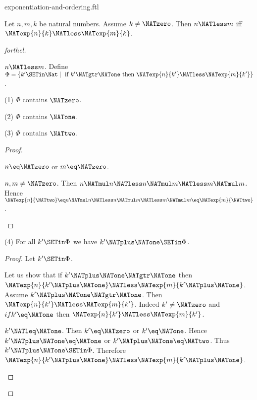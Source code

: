 \documentclass{naproche-library}
\begin{document}
\begin{smodule}[title=Exponentiation and Ordering]{exponentiation-and-ordering.ftl}

\begin{proposition}[forthel,id=ARITHMETIC_09_3373702288769024]
  Let $n, m, k$ be natural numbers.
  Assume $k \neq \NATzero$.
  Then $n \NATless m$ iff $\NATexp{n}{k} \NATless \NATexp{m}{k}$.
\end{proposition}
\begin{proof}[forthel]
  \begin{case}{$n \NATless m$.}
    Define $\Phi = \{ k' \SETin \Nat \mid\text{ if }k' \NATgtr \NATone\text{ then }\NATexp{n}{k'} \NATless \NATexp{m}{k'} \}$.

    (1) $\Phi$ contains $\NATzero$.

    (2) $\Phi$ contains $\NATone$.

    (3) $\Phi$ contains $\NATtwo$.
    \begin{proof}
      \begin{case}{$n \eq \NATzero$ or $m \eq \NATzero$.} \end{case}

      \begin{case}{$n, m \neq \NATzero$.}
        Then $n \NATmul n
          \NATless n \NATmul m
          \NATless m \NATmul m$.
        Hence $\NATexp{n}{\NATtwo}
          \eq n \NATmul n
          \NATless n \NATmul m
          \NATless m \NATmul m
          \eq \NATexp{m}{\NATtwo}$.
      \end{case}
    \end{proof}

    (4) For all $k' \SETin \Phi$ we have $k' \NATplus \NATone \SETin \Phi$.
    \begin{proof}
      Let $k' \SETin \Phi$.

      Let us show that if $k' \NATplus \NATone \NATgtr \NATone$ then $\NATexp{n}{k' \NATplus \NATone} \NATless \NATexp{m}{k' \NATplus \NATone}$.
        Assume $k' \NATplus \NATone \NATgtr \NATone$.
        Then $\NATexp{n}{k'} \NATless \NATexp{m}{k'}$.
        Indeed $k' \neq \NATzero$ and $if k' \eq \NATone$ then $\NATexp{n}{k'} \NATless \NATexp{m}{k'}$.

        \begin{case}{$k' \NATleq \NATone$.}
          Then $k' \eq \NATzero$ or $k' \eq \NATone$.
          Hence $k' \NATplus \NATone \eq \NATone$ or $k' \NATplus \NATone \eq \NATtwo$.
          Thus $k' \NATplus \NATone \SETin \Phi$.
          Therefore $\NATexp{n}{k' \NATplus \NATone} \NATless \NATexp{m}{k' \NATplus \NATone}$.
        \end{case}


\end{proof}
\end{case}
\end{proof}
\end{smodule}
\end{document}
